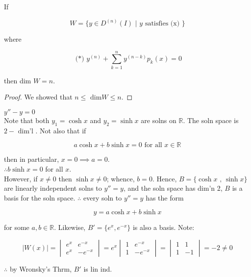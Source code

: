 \begin{corollary}
  If 

  \[ W = \{ y \in D^{(n)} (I) \text{ | } y \text{ satisfies (x) } \} \]

  where

  \[ \text{ (*) } y^{(n)} + \sum_{k=1}^n y^{(n-k)} p_k(x) = 0 \]

  then dim \( W = n \).
\end{corollary}

\begin{proof}
  We showed that \( n \leq \text{ dim} W \leq n \).
\end{proof}

\begin{example}
  \( y'' - y = 0 \) \\
  Note that both \( y_1 = \cosh x \) and \( y_2 = \sinh x \) are solns on
  \( \mathbb{R} \). The soln space is \( 2 - \text{ dim'l } \). Not also
  that if 

  \[ a \cosh x + b \sinh x = 0 \text{ for all } x \in \mathbb{R} \]

  then in particular, \( x = 0 \implies a = 0 \).\\
  \( \therefore b \sinh x = 0 \) for all \( x \). \\

  However, if \( x \neq 0 \) then \( \sinh x \neq 0 \); whence, \( b = 0
  \). Hence, \( B = \{ \cosh x \text{ , } \sinh x \} \) are linearly
  independent solns to \( y'' = y \), and the soln space has dim'n 2, \( B
  \) is a basis for the soln space. \( \therefore \) every soln to \( y''
  = y\) has the form 

  \[ y = a \cosh x + b \sinh x \]

  for some \( a, b \in \mathbb{R} \). Likewise, \( B' = \{ e^x, e^{-x} \}
  \) is also a basis. Note:

  \[  |W(x)| = 
  \begin{vmatrix}
    e^x & e^{-x} \\
    e^x & -e^{-x} 
  \end{vmatrix}
  = e^x
  \begin{vmatrix}
    1 & e^{-x} \\
    1 & -e^{-x} 
  \end{vmatrix}
  =
  \begin{vmatrix}
    1 & 1 \\
    1 & -1 
  \end{vmatrix}
  = -2  \neq 0
  \]

  \( \therefore \) by Wronsky's Thrm, \( B' \) is lin ind. 
\end{example}

